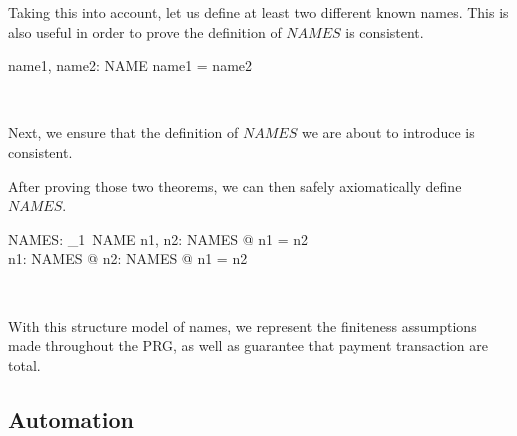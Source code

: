 Taking this into account, let us define at least two different known names.
This is also useful in order to prove the definition of $NAMES$ is consistent.
%
\begin{LNewADef}
\begin{axdef}
  name1, name2: NAME
\where
  \lnot name1 = name2
\end{axdef}~\end{LNewADef}
%
Next, we ensure that the definition of $NAMES$ we are about to introduce is
consistent.
%
%
%
After proving those two theorems, we can then safely axiomatically define $NAMES$.
%
\begin{LNewADef}
\begin{axdef}
  NAMES: \finset_1~NAME
\where
  \exists n1, n2: NAMES @ \lnot  n1 = n2 \\
  \forall n1: NAMES @ \exists  n2: NAMES @ \lnot  n1 = n2
\end{axdef}~\end{LNewADef}
%
With this structure model of names, we represent the finiteness assumptions
made throughout the PRG, as well as guarantee that payment transaction are
total.

\subsection*{Automation}



